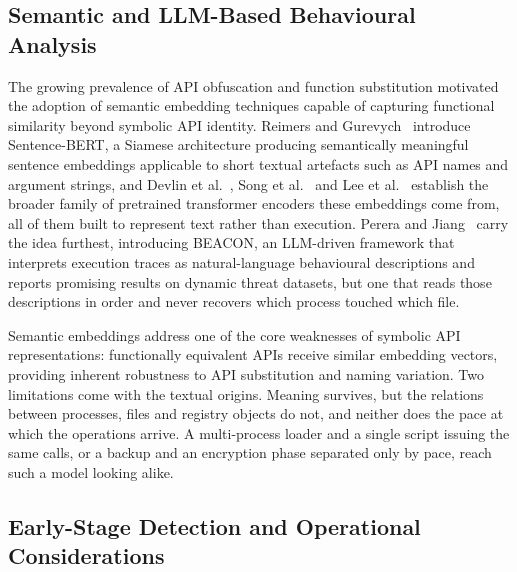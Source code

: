 \documentclass[%
    BCOR=10mm,
    DIV=13,
    toc=bibliography,
    toc=listof,
    oneside,
    12pt,
]{scrbook}
\begin{document}
\subsection{Semantic and LLM-Based Behavioural Analysis}
\label{subsec:semantic_llm}

The growing prevalence of API obfuscation and function substitution motivated
the adoption of semantic embedding techniques capable of capturing functional
similarity beyond symbolic API identity. Reimers and
Gurevych~\cite{reimers2019sbert} introduce Sentence-BERT, a Siamese
architecture producing semantically meaningful sentence embeddings applicable
to short textual artefacts such as API names and argument strings, and Devlin
et al.~\cite{devlin2019bert}, Song et al.~\cite{mpnet2020} and Lee et
al.~\cite{lee2024gecko} establish the broader family of pretrained transformer
encoders these embeddings come from, all of them built to represent text
rather than execution. Perera and Jiang~\cite{perera2023beacon} carry the idea
furthest, introducing BEACON, an LLM-driven framework that interprets
execution traces as natural-language behavioural descriptions and reports
promising results on dynamic threat datasets, but one that reads those
descriptions in order and never recovers which process touched which file.

Semantic embeddings address one of the core weaknesses of symbolic API
representations: functionally equivalent APIs receive similar embedding
vectors, providing inherent robustness to API substitution and naming
variation. Two limitations come with the textual origins. Meaning survives,
but the relations between processes, files and registry objects do not, and
neither does the pace at which the operations arrive. A multi-process loader
and a single script issuing the same calls, or a backup and an encryption
phase separated only by pace, reach such a model looking alike.

\subsection{Early-Stage Detection and Operational Considerations}
\label{subsec:early_stage}
\end{document}
